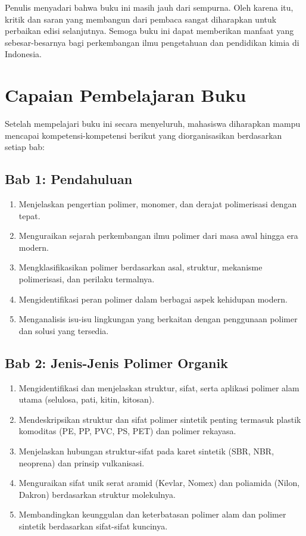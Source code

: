 \documentclass[12pt,a4paper,openany]{book}
\begin{document}
Penulis menyadari bahwa buku ini masih jauh dari sempurna. Oleh karena itu, kritik dan saran yang membangun dari pembaca sangat diharapkan untuk perbaikan edisi selanjutnya. Semoga buku ini dapat memberikan manfaat yang sebesar-besarnya bagi perkembangan ilmu pengetahuan dan pendidikan kimia di Indonesia.

\newpage

\chapter*{Capaian Pembelajaran Buku}

Setelah mempelajari buku ini secara menyeluruh, mahasiswa diharapkan mampu mencapai kompetensi-kompetensi berikut yang diorganisasikan berdasarkan setiap bab:

\section*{Bab 1: Pendahuluan}
\begin{enumerate}[label=\arabic*.]
  \item Menjelaskan pengertian polimer, monomer, dan derajat polimerisasi dengan tepat.
  \item Menguraikan sejarah perkembangan ilmu polimer dari masa awal hingga era modern.
  \item Mengklasifikasikan polimer berdasarkan asal, struktur, mekanisme polimerisasi, dan perilaku termalnya.
  \item Mengidentifikasi peran polimer dalam berbagai aspek kehidupan modern.
  \item Menganalisis isu-isu lingkungan yang berkaitan dengan penggunaan polimer dan solusi yang tersedia.
\end{enumerate}

\section*{Bab 2: Jenis-Jenis Polimer Organik}
\begin{enumerate}[label=\arabic*.]
  \item Mengidentifikasi dan menjelaskan struktur, sifat, serta aplikasi polimer alam utama (selulosa, pati, kitin, kitosan).
  \item Mendeskripsikan struktur dan sifat polimer sintetik penting termasuk plastik komoditas (PE, PP, PVC, PS, PET) dan polimer rekayasa.
  \item Menjelaskan hubungan struktur-sifat pada karet sintetik (SBR, NBR, neoprena) dan prinsip vulkanisasi.
  \item Menguraikan sifat unik serat aramid (Kevlar, Nomex) dan poliamida (Nilon, Dakron) berdasarkan struktur molekulnya.
  \item Membandingkan keunggulan dan keterbatasan polimer alam dan polimer sintetik berdasarkan sifat-sifat kuncinya.
\end{enumerate}
\end{document}
